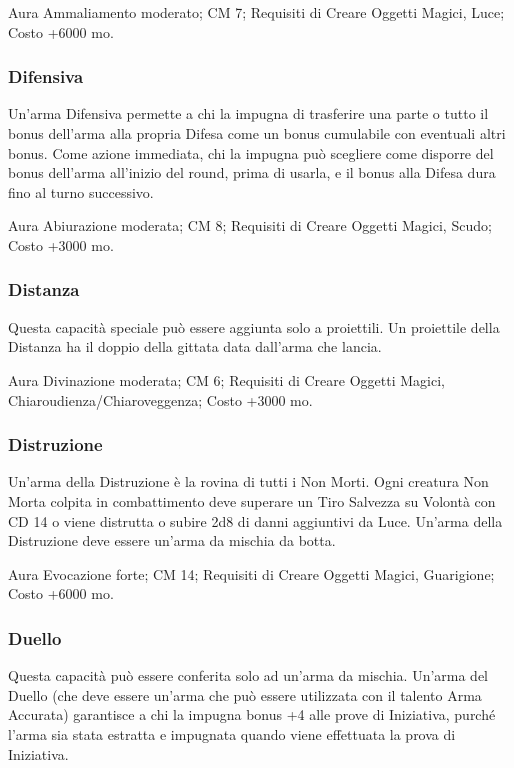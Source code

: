 \begin{multicols}{2}
Aura Ammaliamento moderato; CM 7; Requisiti di Creare Oggetti Magici, Luce; Costo +6000 mo.

\subsubsection{Difensiva}

Un'arma Difensiva permette a chi la impugna di trasferire una parte o tutto il bonus dell'arma alla propria Difesa come un bonus cumulabile con eventuali altri bonus. Come azione immediata, chi la impugna può scegliere come disporre del bonus dell'arma all'inizio del round, prima di usarla, e il bonus alla Difesa dura fino al turno successivo.

Aura Abiurazione moderata; CM 8; Requisiti di Creare Oggetti Magici, Scudo; Costo +3000 mo.

\subsubsection{Distanza}

Questa capacità speciale può essere aggiunta solo a proiettili. Un proiettile della Distanza ha il doppio della gittata data dall'arma che lancia.

Aura Divinazione moderata; CM 6; Requisiti di Creare Oggetti Magici, Chiaroudienza/Chiaroveggenza; Costo +3000 mo.


\subsubsection{Distruzione}

Un'arma della Distruzione è la rovina di tutti i Non Morti. Ogni creatura Non Morta colpita in combattimento deve superare un Tiro Salvezza su Volontà con CD 14 o viene distrutta o subire 2d8 di danni aggiuntivi da Luce. Un'arma della Distruzione deve essere un'arma da mischia da botta.

Aura Evocazione forte; CM 14; Requisiti di Creare Oggetti Magici, Guarigione; Costo +6000 mo.

\subsubsection{Duello}

Questa capacità può essere conferita solo ad un'arma da mischia. Un'arma del Duello (che deve essere un'arma che può essere utilizzata con il talento Arma Accurata) garantisce a chi la impugna bonus +4 alle prove di Iniziativa, purché l'arma sia stata estratta e impugnata quando viene effettuata la prova di Iniziativa. \\


\end{multicols}
